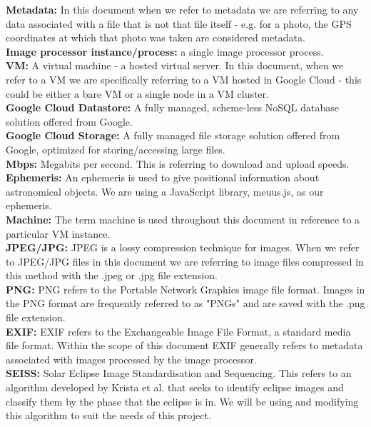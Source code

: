 \documentclass[10pt, onecolumn, draftclsnofoot, letterpaper, compsoc]{IEEEtran}
\begin{document}
\noindent \textbf{Metadata:} In this document when we refer to metadata we are
referring to any data associated with a file that is not that file itself -
e.g. for a photo, the GPS coordinates at which that photo was taken are
considered metadata.\\

\noindent \textbf{Image processor instance/process:} a single image processor
process. \\

\noindent \textbf{VM:}  A virtual machine - a hosted virtual server. In this
document, when we refer to a VM we are specifically referring to a VM hosted in
Google Cloud - this could be either a bare VM or a single node in a VM cluster.\\

\noindent \textbf{Google Cloud Datastore:} A fully managed, scheme-less NoSQL
database solution offered from Google.\\

\noindent \textbf{Google Cloud Storage:}  A fully managed file storage solution
offered from Google, optimized for storing/accessing large files.\\

\noindent \textbf{Mbps:} Megabits per second. This is referring to download and
upload speeds.\\

\noindent \textbf{Ephemeris:} An ephemeris is used to give positional information
about astronomical objects. We are using a JavaScript library, meuus.js, as our
ephemeris.\\

\noindent \textbf{Machine:} The term machine is used throughout this document in
reference to a particular VM instance.\\

\noindent \textbf{JPEG/JPG:}
JPEG is a lossy compression technique for images. When we refer
to JPEG/JPG files in this document we are referring to image files
compressed in this method with the .jpeg or .jpg file extension. \\

\noindent \textbf{PNG:}
PNG refers to the Portable Network Graphics image file format.
Images in the PNG format are frequently referred to as "PNGs" and are
saved with the .png file extension. \\

\noindent \textbf{EXIF:} EXIF refers to the Exchangeable Image File Format, a
standard  media file format. Within the scope of this document EXIF generally
refers to metadata associated with images processed by the image processor. \\

\noindent \textbf{SEISS:} Solar Eclipse Image Standardisation and Sequencing.
This refers to an algorithm developed by Krista et al. \cite{imgKrista} that
seeks to identify eclipse images and classify them by the phase that the
eclipse is in. We will be using and modifying this algorithm to suit the needs
of this project. \\



\end{document}
